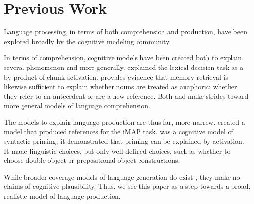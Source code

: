 \section{Previous Work}
Language processing, in terms of both comprehension and production, have been explored broadly by the cognitive modeling community.

In terms of comprehension, cognitive models have been created both to explain several phenomenon and more generally. \citet{decision} explained the lexical decision task as a by-product of chunk activation. \citet{anaphoric} provides evidence that memory retrieval is likewise sufficient to explain whether nouns are treated as anaphoric: whether they refer to an antecedent or are a new reference. Both \citet{comp-model} and \citet{big-comprehension} make strides toward more general models of language comprehension.

The models to explain language production are thus far, more narrow. \citet{references} created a model that produced references for the iMAP task. \citet{model} was a cognitive model of syntactic priming; it demonstrated that priming can be explained by activation. It made linguistic choices, but only well-defined choices, such as whether to choose double object or prepositional object constructions. 

While broader coverage models of language generation do exist \citep{chart}, they make no claims of cognitive plausibility. Thus, we see this paper as a step towards a broad, realistic model of language production. 